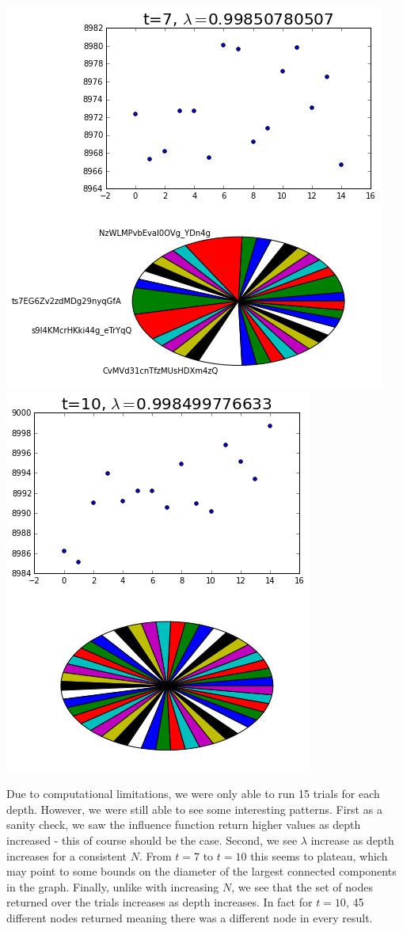 \documentclass{article}
\begin{document}
{		\includegraphics[scale=0.4]{full_7t}
		\hspace*{2cm}
		\includegraphics[scale=0.4]{full_10t}
		\par}	
	
	Due to computational limitations, we were only able to run 15 trials for each depth. However, we were still able to see some interesting patterns. First as a sanity check, we saw the influence function return higher values as depth increased - this of course should be the case. Second, we see $\lambda$ increase as depth increases for a consistent $N$. From $t=7$ to $t=10$ this seems to plateau, which may point to some bounds on the diameter of the largest connected components in the graph. Finally, unlike with increasing $N$, we see that the set of nodes returned over the trials increases as depth increases. In fact for $t=10$, 45 different nodes returned meaning there was a different node in every result.
	
\end{document}
